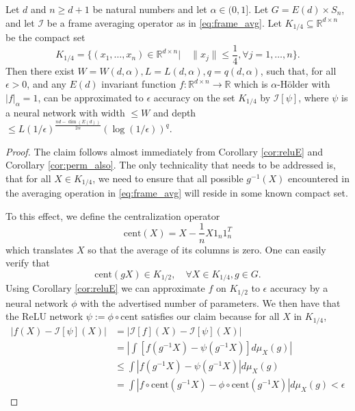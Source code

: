 \documentclass[twoside,11pt]{article}
\newcommand{\RR}{\mathbb{R}}
\newcommand{\cent}{\mathrm{cent}}
\begin{document}
\begin{prop}\label{prop:reluE}
Let $d$ and $n\geq d+1$ be natural numbers and let $\alpha\in (0,1] $. Let  $G=E(d)\times S_n$, and let $\mathcal I$ be a frame averaging operator as in \eqref{eq:frame_avg}. Let $K_{1/4}\subseteq \RR^{d\times n}$ be the compact set 
$$K_{1/4}=\{(x_1,\ldots,x_n)\in \RR^{d\times n}| \quad \|x_j\| \leq \frac{1}{4}, \forall j=1,\ldots,n\} .$$
Then there exist $W=W(d,\alpha),L=L(d,\alpha),q=q(d,\alpha)$, such that, for all $\epsilon>0$, and any $E(d)$ invariant function $f:\RR^{d\times n} \to \RR $ which is $\alpha$-H\"older with $|f|_\alpha=1 $,  can be approximated to $\epsilon$ accuracy on the set $K_{1/4}$ by $\mathcal{I}[\psi] $, where $\psi$ is a neural network with width $\leq W$ and depth $\leq L(1/\epsilon)^{\frac{nd-\dim(E(d))}{2\alpha}}\left(\log(1/\epsilon)\right)^q$.
\end{prop}



\begin{proof}
The claim follows almost immediately from Corollary \ref{cor:reluE} and Corollary \ref{cor:perm_also}. The only technicality that needs to be addressed is, that for all $X\in K_{1/4}$, we need to ensure that all possible $g^{-1}(X)$ encountered in the averaging operation in \eqref{eq:frame_avg} will reside in some known compact set. 

To this effect, we define the centralization operator
\begin{equation}\label{eq:cent}
\cent(X)=X-\frac{1}{n}X1_n1_n^T \end{equation}
which translates $X$ so that the average of its columns is zero. One can easily verify that
$$\cent(gX)\in K_{1/2}, \quad \forall X \in K_{1/4}, g\in G .$$
Using Corollary \ref{cor:reluE} we can approximate $f$ on $K_{1/2} $ to $\epsilon$ accuracy by a neural network $\phi$ with the advertised number of parameters. We then have that the ReLU network $\psi:=\phi \circ \cent $ satisfies our claim because 
 for all $X$ in $K_{1/4} $,
\begin{align*}
|f(X)-\mathcal{I}[\psi](X)|&=|\mathcal{I}[f](X)-\mathcal{I}[\psi](X)|\\
&=\left| \int \left[f(g^{-1}X)-\psi(g^{-1}X) \right]d\mu_X(g)  \right| \\
&\leq \int \left|f(g^{-1}X)-\psi(g^{-1}X) \right|d\mu_X(g)\\
&=\int \left|f\circ \cent(g^{-1}X)-\phi\circ \cent(g^{-1}X) \right|d\mu_X(g)<\epsilon 
\end{align*}
\end{proof}
\end{document}
